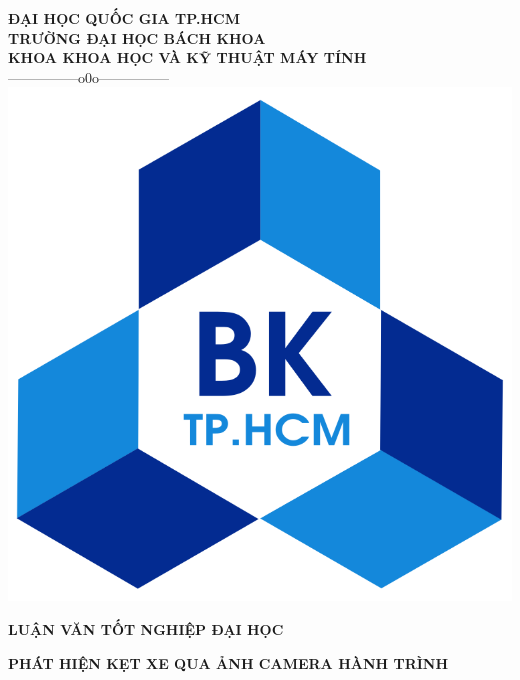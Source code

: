 \documentclass[12pt]{report}
\begin{document}
\begin{titlepage}

\begin{center}
	\textbf{{\fontsize{15}{15}\selectfont ĐẠI HỌC QUỐC GIA TP.HCM}}\\
	\textbf{{\fontsize{15}{15}\selectfont TRƯỜNG ĐẠI HỌC BÁCH KHOA}}\\
	\textbf{{\fontsize{15}{15}\selectfont KHOA KHOA HỌC VÀ KỸ THUẬT MÁY TÍNH}}\\
	---------------o0o--------------- \\
	\vspace{5mm}
	\includegraphics[scale=0.2]{charts/logo.png}
\end{center}
\vspace{5mm}

\begin{center}
	\textbf{{\fontsize{15}{15}\selectfont LUẬN VĂN TỐT NGHIỆP ĐẠI HỌC}}
\end{center}
\begin{center}
\textbf{{\fontsize{22}{15}\selectfont PHÁT HIỆN KẸT XE QUA ẢNH CAMERA HÀNH TRÌNH}}
\end{center}


\end{titlepage}
\end{document}

